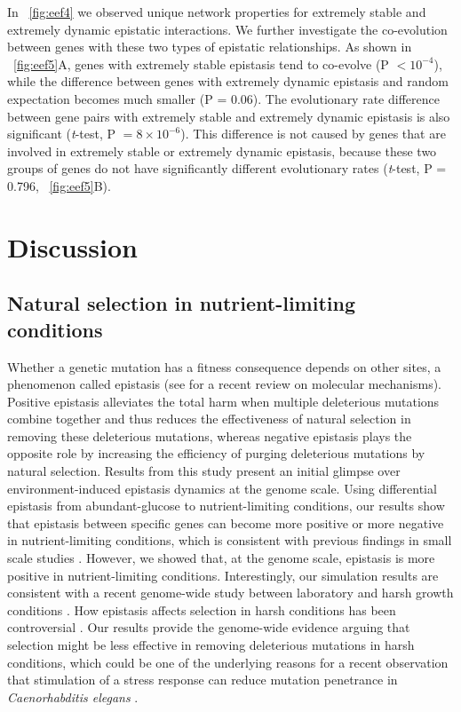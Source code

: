 In \Fig~\ref{fig:eef4} we observed unique network properties for extremely stable
and extremely dynamic epistatic interactions. We further investigate
the co-evolution between genes with these two types of epistatic
relationships. As shown in \Fig~\ref{fig:eef5}A, genes with extremely stable
epistasis tend to co-evolve (P $< 10^{-4}$), while the difference between
genes with extremely dynamic epistasis and random expectation becomes
much smaller (P = 0.06). The evolutionary rate difference between gene
pairs with extremely stable and extremely dynamic epistasis is also
significant (\textit{t}-test, P $= 8\times 10^{-6}$). This difference is not caused by
genes that are involved in extremely stable or extremely dynamic
epistasis, because these two groups of genes do not have significantly
different evolutionary rates (\textit{t}-test, P = 0.796, \Fig~\ref{fig:eef5}B).

\section{Discussion}

\subsection{Natural selection in nutrient-limiting conditions}

Whether a genetic mutation has a fitness consequence depends on other
sites, a phenomenon called epistasis (see \citet{Lehner2011} for a
recent review on
molecular mechanisms). Positive epistasis alleviates the total harm
when multiple deleterious mutations combine together and thus reduces
the effectiveness of natural selection in removing these deleterious
mutations, whereas negative epistasis plays the opposite role by
increasing the efficiency of purging deleterious mutations by natural
selection. Results from this study present an initial glimpse over
environment-induced epistasis dynamics at the genome scale. Using
differential epistasis from abundant-glucose to nutrient-limiting
conditions, our results show that epistasis between specific genes can
become more positive or more negative in nutrient-limiting conditions,
which is consistent with previous findings in small scale studies
\citep{Remold2001, Kishony2003, Cooper2005, Korona1999, Szafraniec2001,
Jasnos2008, Vassilieva2000, Baer2006, Yang2001, Fry2002,
AletheaD.Wang2009, Young2009}. However, we showed that, at the genome
scale, epistasis is
more positive in nutrient-limiting conditions. Interestingly, our
simulation results are consistent with a recent genome-wide study
between laboratory and harsh growth conditions
\citep{Bandyopadhyay2011}. How epistasis affects selection in harsh
conditions has been controversial \citep{Agrawal2010}. Our
results provide the genome-wide evidence arguing that selection might
be less effective in removing deleterious mutations in harsh
conditions, which could be one of the underlying reasons for a recent
observation that stimulation of a stress response can reduce mutation
penetrance in \textit{Caenorhabditis elegans} \citep{Casanueva2012}.

